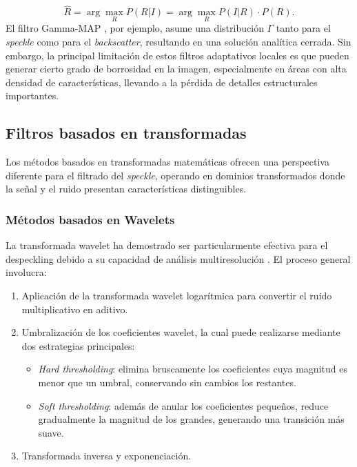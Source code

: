 \begin{equation}
	\hat{R} = \arg\max_R P(R|I) = \arg\max_R P(I|R) \cdot P(R).
\end{equation}
El filtro Gamma-MAP \cite{lopes1993maximum}, por ejemplo, asume una distribución $\Gamma$ tanto para el \emph{speckle} como para el \emph{backscatter}, resultando en una solución analítica cerrada. Sin embargo, la principal limitación de estos filtros adaptativos locales es que pueden generar cierto grado de borrosidad en la imagen, especialmente en áreas con alta densidad de características, llevando a la pérdida de detalles estructurales importantes.

\subsection{Filtros basados en transformadas}

Los métodos basados en transformadas matemáticas ofrecen una perspectiva diferente para el filtrado del \emph{speckle}, operando en dominios transformados donde la señal y el ruido presentan características distinguibles.

\subsubsection{Métodos basados en Wavelets}

La transformada wavelet ha demostrado ser particularmente efectiva para el despeckling debido a su capacidad de análisis multiresolución \cite{argenti2002speckle}. El proceso general involucra:

\begin{enumerate}
	\item Aplicación de la transformada wavelet logarítmica para convertir el ruido multiplicativo en aditivo.
		\item Umbralización de los coeficientes wavelet, la cual puede realizarse mediante dos estrategias principales:
	\begin{itemize}
		\item \emph{Hard thresholding}: elimina bruscamente los coeficientes cuya magnitud es menor que un umbral, conservando sin cambios los restantes.
		\item \emph{Soft thresholding}: además de anular los coeficientes pequeños, reduce gradualmente la magnitud de los grandes, generando una transición más suave.
	\end{itemize}
	\item Transformada inversa y exponenciación.
\end{enumerate}

